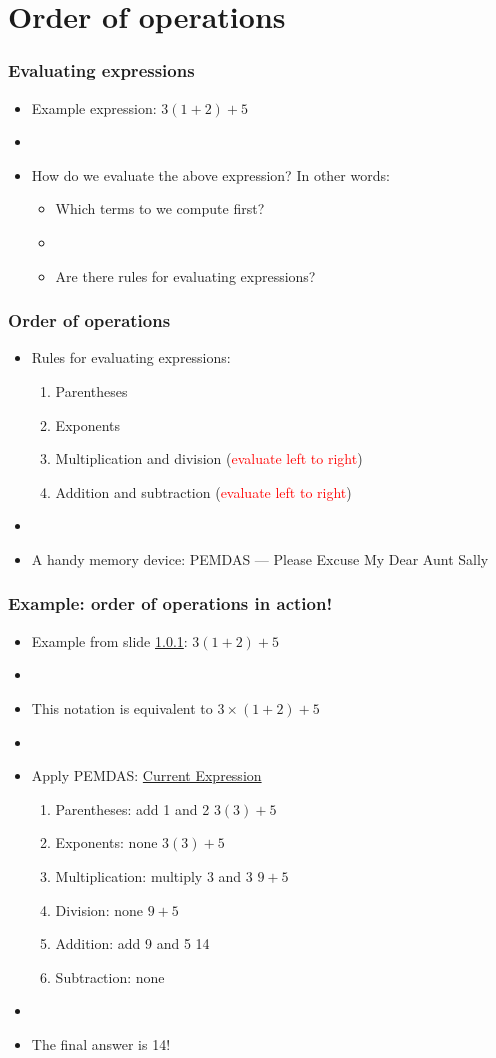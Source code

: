 \documentclass[11pt,dvipsnames]{beamer}
\newcommand{\myframe}[1]{\begin{frame} \frametitle{#1}}
\begin{document}
\section{Order of operations}
\myframe{Evaluating expressions}\label{ex:oo1}
\begin{itemize}
\item Example expression: $3(1 + 2) + 5$
\item[]
\item How do we evaluate the above expression? In other words:
\begin{itemize}
\item Which terms to we compute first?
\item[]
\item Are there rules for evaluating expressions?
\end{itemize}
\end{itemize}
\end{frame}

\myframe{Order of operations}
\begin{itemize}
\item Rules for evaluating expressions:
\begin{enumerate}
\item Parentheses
\item Exponents
\item Multiplication and division (\textcolor{red}{evaluate left to right})
\item Addition and subtraction (\textcolor{red}{evaluate left to right})
\end{enumerate}
\item[]
\item A handy memory device: PEMDAS --- Please Excuse My Dear Aunt Sally
\end{itemize}
\end{frame}

\myframe{Example: order of operations in action!}
\begin{itemize}
\item Example from slide \ref{ex:oo1}: $3(1 + 2) + 5$
\item[]
\item This notation is equivalent to $3\times (1+2) + 5$
\item[]
\item Apply PEMDAS: \hfill \underline{Current Expression}
\begin{enumerate}
\item Parentheses: add 1 and 2 \hfill $3(3) + 5$
\item Exponents: none \hfill $3(3) + 5$
\item Multiplication: multiply 3 and 3 \hfill $9 + 5$
\item Division: none \hfill $9 + 5$
\item Addition: add 9 and 5 \hfill 14
\item Subtraction: none
\end{enumerate}
\item[]
\item The final answer is 14!
\end{itemize}
\end{frame}
\end{document}
